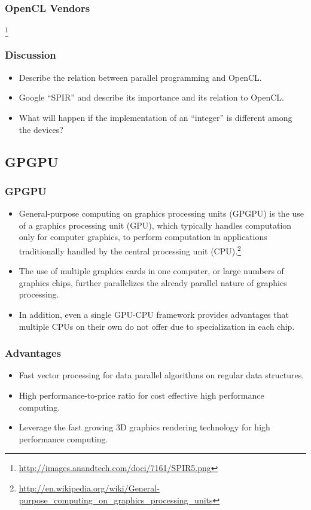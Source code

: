 \documentclass{beamer}
\begin{document}
\begin{frame}
  \frametitle{OpenCL Vendors}
  \centerline{}\footnote{\url{http://images.anandtech.com/doci/7161/SPIR5.png}}
\end{frame}

\begin{frame}
  \frametitle{Discussion}
  \begin{itemize}
  \item Describe the relation between parallel programming and OpenCL.
  \item Google ``SPIR'' and describe its importance and its
    relation to OpenCL.
  \item What will happen if the implementation of an ``integer'' is
    different among the devices?
  \end{itemize}
\end{frame}

\subsection{GPGPU}

\begin{frame}
  \frametitle{GPGPU}
  \begin{itemize}
  \item General-purpose computing on graphics processing units (GPGPU)
    is the use of a graphics processing unit (GPU), which typically
    handles computation only for computer graphics, to perform
    computation in applications traditionally handled by the central
    processing unit
    (CPU).\footnote{\url{http://en.wikipedia.org/wiki/General-purpose_computing_on_graphics_processing_units}}
  \end{itemize}
\end{frame}

\begin{frame}
  \begin{itemize}
  \item The use of multiple graphics cards in one computer, or large
    numbers of graphics chips, further parallelizes the already parallel
    nature of graphics processing.
  \item In addition, even a single GPU-CPU framework provides advantages
    that multiple CPUs on their own do not offer due to specialization
    in each chip.
  \end{itemize}
\end{frame}

\begin{frame}
  \frametitle{Advantages}
  \begin{itemize}
  \item Fast vector processing for data parallel algorithms on regular
    data structures.
  \item High performance-to-price ratio for cost effective high
    performance computing.
  \item Leverage the fast growing 3D graphics rendering technology for
    high performance computing.
  \end{itemize}
\end{frame}
\end{document}
